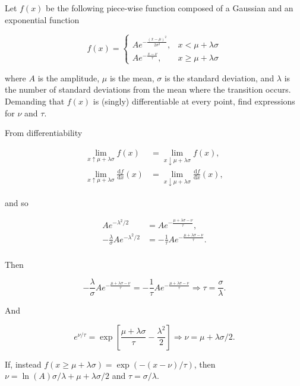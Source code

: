 \documentclass[14pt]{extarticle}
\renewcommand{\d}{\ensuremath{\mathrm{d}}\xspace}
\newcommand{\ddx}[1]{\ensuremath{\frac{\d #1}{\d x}}\xspace}
\begin{document}
Let \(f(x)\) be the following piece-wise function composed of a Gaussian and an exponential function

\begin{equation}
  f(x) =
  \begin{cases}
    A e^{-\frac{(x - \mu)^2}{2\sigma^2}}, & x < \mu + \lambda \sigma \\
    A e^{-\frac{x - \nu}{\tau}}, & x \geq \mu + \lambda \sigma
  \end{cases}
\end{equation}

where \(A\) is the amplitude, \(\mu\) is the mean, \(\sigma\) is the standard deviation, and \(\lambda\) is the number of standard deviations from the mean where the transition occurs.
Demanding that \(f(x)\) is (singly) differentiable at every point, find expressions for \(\nu\) and \(\tau\).

From differentiability

\begin{align}
  \lim_{x \uparrow \mu + \lambda \sigma} f(x) &= \lim_{x \downarrow \mu + \lambda \sigma} f(x), \\
  \lim_{x \uparrow \mu + \lambda \sigma} \ddx{f}(x) &= \lim_{x \downarrow \mu + \lambda \sigma} \ddx{f}(x),
\end{align}

and so

\begin{align}
  A e^{-\lambda^2/2}
    &= A e^{- \frac{\mu + \lambda \sigma - \nu}{\tau}}, \\
  - \frac{\lambda}{\sigma} A e^{-\lambda^2/2}
    &= - \frac{1}{\tau} A e^{-\frac{\mu + \lambda \sigma - \nu}{\tau}}. \\
\end{align}

Then

\begin{equation}
  - \frac{\lambda}{\sigma} A e^{-\frac{\mu + \lambda \sigma - \nu}{\tau}} = - \frac{1}{\tau} A e^{-\frac{\mu + \lambda \sigma - \nu}{\tau}}
  \Rightarrow \tau = \frac{\sigma}{\lambda}.
\end{equation}

And

\begin{equation}
  e^{\nu/\tau} = \exp\left[\frac{\mu + \lambda \sigma}{\tau} - \frac{\lambda^2}{2}\right]
  \Rightarrow \nu = \mu + \lambda \sigma / 2.
\end{equation}

If, instead \(f(x \geq \mu + \lambda \sigma) = \exp(-(x-\nu)/\tau)\), then \(\nu = \ln(A) \sigma/\lambda + \mu + \lambda \sigma / 2\) and \(\tau = \sigma/\lambda\).
\end{document}
